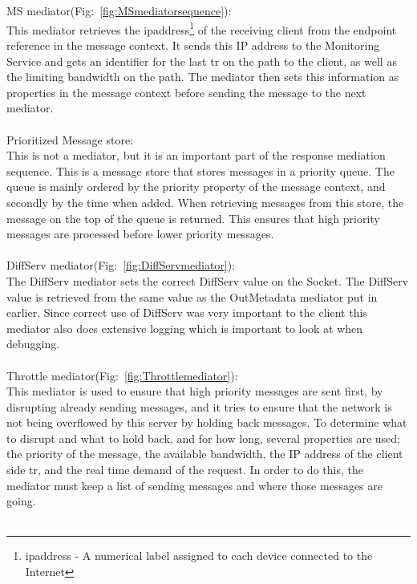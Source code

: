 \\\\
MS mediator(Fig:~\ref{fig:MSmediatorsequence}):\\
    This mediator retrieves the \gls{ipaddress}\footnote{\gls{ipaddress} - A numerical label assigned to each device connected to the Internet} of the receiving client from the endpoint reference in the message context. It sends this IP address to the Monitoring Service and gets an identifier for the last \gls{tr} on the path to the client, as well as the limiting bandwidth on the path. The mediator then sets this information as properties in the message context before sending the message to the next mediator.
\\\\
Prioritized Message store:\\
    This is not a mediator, but it is an important part of the response mediation sequence. This is a message store that stores messages in a priority queue. The queue is mainly ordered by the priority property of the message context, and secondly by the time when added. When retrieving messages from this store, the message on the top of the queue is returned. This ensures that high priority messages are processed before lower priority messages.
\\\\
DiffServ mediator(Fig:~\ref{fig:DiffServmediator}):\\
	The DiffServ mediator sets the correct DiffServ value on the Socket. The DiffServ value is retrieved from the same value as the OutMetadata mediator put in earlier. Since correct use of DiffServ was very important to the client this mediator also does extensive logging which is important to look at when debugging.
\\\\
Throttle mediator(Fig:~\ref{fig:Throttlemediator}):\\
    This mediator is used to ensure that high priority messages are sent first, by disrupting already sending messages, and it tries to ensure that the network is not being overflowed by this server by holding back messages. To determine what to disrupt and what to hold back, and for how long, several properties are used; the priority of the message, the available bandwidth, the IP address of the client side \gls{tr}, and the real time demand of the request. In order to do this, the mediator must keep a list of sending messages and where those messages are going.
\\\\
